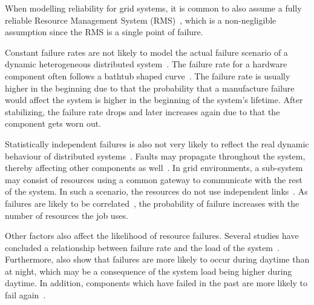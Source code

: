 \documentclass{cslthse-msc}
\begin{document}
When modelling reliability for grid systems, it is common to also assume a fully reliable Resource Management System (RMS)~\cite{relAndPerfGridServices, relGridServicePredConstraint}, which is a non-negligible assumption since the RMS is a single point of failure.


Constant failure rates are not likely to model the actual failure scenario of a dynamic heterogeneous distributed system~\cite{algoMinExTime}. The failure rate for a hardware component often follows a bathtub shaped curve~\cite{surveyReliabilityDistr}. The failure rate is usually higher in the beginning due to that the probability that a manufacture failure would affect the system is higher in the beginning of the system's lifetime. After stabilizing, the failure rate drops and later increases again due to that the component gets worn out. %

Statistically independent failures is also not very likely to reflect the real dynamic behaviour of distributed systems~\cite{surveyReliabilityDistr, cloudServiceRel}. Faults may propagate throughout the system, thereby affecting other components as well~\cite{relGridSystems}. In grid environments, a sub-system may consist of resources using a common gateway to communicate with the rest of the system. In such a scenario, the resources do not use independent links~\cite{optResourceAllMaxPerformance}. As failures are likely to be correlated~\cite{perfImplPerCheckPoint}, the probability of failure increases with the number of resources the job uses.

Other factors also affect the likelihood of resource failures. Several studies have concluded a relationship between failure rate and the load of the system~\cite{studyOfFailures, implicationsOfFailures}. Furthermore, \cite{studyOfFailures, implicationsOfFailures} also show that failures are more likely to occur during daytime than at night, which may be a consequence of the system load being higher during daytime. In addition, components which have failed in the past are more likely to fail again~\cite{implicationsOfFailures}.
\end{document}
